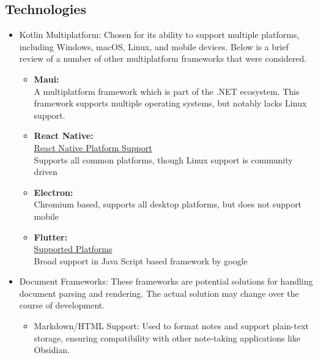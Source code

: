 \subsection{Technologies}
\begin{itemize}
    \item Kotlin Multiplatform: Chosen for its ability to support multiple platforms, including Windows, macOS, Linux, and mobile devices.
    Below is a brief review of a number of other multiplatform frameworks that were considered.
        \begin{itemize}
            \item \textbf{Maui:}\\
            A multiplatform framework which is part of the .NET ecosystem. This framework supports multiple operating systems, but notably lacks Linux support.
            
            \item \textbf{React Native:} \\
            \href{https://reactnative.dev/docs/out-of-tree-platforms}{React Native Platform Support}\\
            Supports all common platforms, though Linux support is community driven
            
            \item \textbf{Electron:}\\
            Chromium based, supports all desktop platforms, but does not support mobile
            
            \item \textbf{Flutter:} \\
            \href{[https://docs.flutter.dev/reference/supported-platforms}{Supported Platforms}\\
            Broad support in Java Script based framework by google
            
        \end{itemize}

    \item Document Frameworks: 
    These frameworks are potential solutions for handling document parsing and rendering. The actual solution may change over the course of development. 
    
        \begin{itemize}
            \item Markdown/HTML Support: Used to format notes and support plain-text storage, ensuring compatibility with other note-taking applications like Obsidian.
            

\end{itemize}
\end{itemize}
